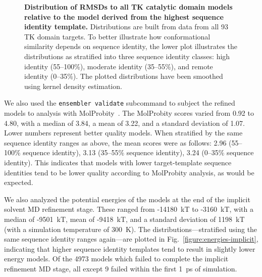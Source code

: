 \documentclass[aps,prl,preprint,nofootinbib,superscriptaddress,linenumbers]{revtex4-1}
\begin{document}

\begin{figure}[tbp]
    \centering
    {\label{figure:rmsd-distribution-joint}%
    }

    {\label{figure:rmsd-distribution-by-sequence-identity}%
    }

    \caption{{\bf Distribution of RMSDs to all TK catalytic domain models relative to the model derived from the highest sequence identity template.}    
    Distributions are built from data from all 93 TK domain targets.
    To better illustrate how conformational similarity depends on sequence identity, the lower plot illustrates the distributions as stratified into three sequence identity classes: high identity (55--100\%), moderate identity (35--55\%), and remote identity (0--35\%).
    The plotted distributions have been smoothed using kernel density estimation.
  \label{figure:rmsd-distributions}
  }
\end{figure}

We also used the {\tt ensembler validate} subcommand to subject the refined models to analysis with MolProbity~\cite{molprobity:2007,molprobity:2010}.
The MolProbity scores varied from 0.92 to 4.80, with a median of 3.84, a mean of 3.22, and a standard deviation of 1.07.
Lower numbers represent better quality models.
When stratified by the same sequence identity ranges as above, the mean scores were as follows: 2.96 (55--100\% sequence identity), 3.13 (35--55\% sequence identity), 3.24 (0--35\% sequence identity).
This indicates that models with lower target-template sequence identities tend to be lower quality according to MolProbity analysis, as would be expected.

We also analyzed the potential energies of the models at the end of the implicit solvent MD refinement stage.
These ranged from -14180~kT to -3160~kT, with a median of -9501~kT, mean of -9418~kT, and a standard deviation of 1198~kT (with a simulation temperature of 300~K).
The distributions---stratified using the same sequence identity ranges again---are plotted in Fig.~\ref{figure:energies-implicit}, indicating that higher sequence identity templates tend to result in slightly lower energy models.
Of the \num{4973} models which failed to complete the implicit refinement MD stage, all except 9 failed within the first 1~ps of simulation.
\end{document}
